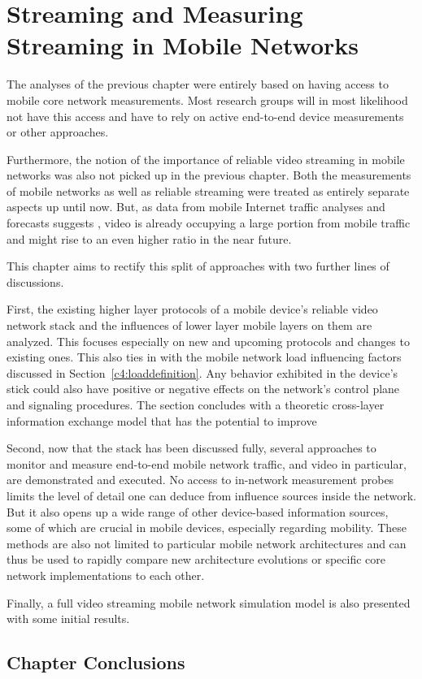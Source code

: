 \chapter{Streaming and Measuring Streaming in Mobile Networks}
\label{chap:mobilestreaming}

The analyses of the previous chapter were entirely based on having access to mobile core network measurements. Most research groups will in most likelihood not have this access and have to rely on active end-to-end device measurements or other approaches.

Furthermore, the notion of the importance of reliable video streaming in mobile networks was also not picked up in the previous chapter. Both the measurements of mobile networks as well as reliable streaming were treated as entirely separate aspects up until now. But, as data from mobile Internet traffic analyses and forecasts suggests \cite{cisco2014VNI}, video is already occupying a large portion from mobile traffic and might rise to an even higher ratio in the near future.

This chapter aims to rectify this split of approaches with two further lines of discussions. 

First, the existing higher layer protocols of a mobile device's reliable video network stack and the influences of lower layer mobile layers on them are analyzed. This focuses especially on new and upcoming protocols and changes to existing ones. This also ties in with the mobile network load influencing factors discussed in Section~\ref{c4:loaddefinition}. Any behavior exhibited in the device's stick could also have positive or negative effects on the network's control plane and signaling procedures. The section concludes with a theoretic cross-layer information exchange model that has the potential to improve 

Second, now that the stack has been discussed fully, several approaches to monitor and measure end-to-end mobile network traffic, and video in particular, are demonstrated and executed. No access to in-network measurement probes limits the level of detail one can deduce from influence sources inside the network. But it also opens up a wide range of other device-based information sources, some of which are crucial in mobile devices, especially regarding mobility. These methods are also not limited to particular mobile network architectures and can thus be used to rapidly compare new architecture evolutions or specific core network implementations to each other. 

Finally, a full video streaming mobile network simulation model is also presented with some initial results.







\section{Chapter Conclusions}




